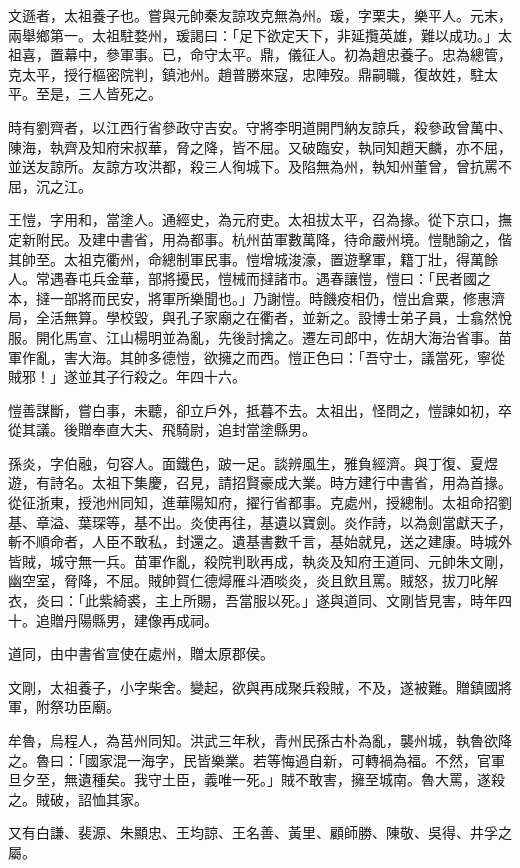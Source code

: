 \begin{pinyinscope}
文遜者，太祖養子也。嘗與元帥秦友諒攻克無為州。瑗，字栗夫，樂平人。元末，兩舉鄉第一。太祖駐婺州，瑗謁曰：「足下欲定天下，非延攬英雄，難以成功。」太祖喜，置幕中，參軍事。已，命守太平。鼎，儀征人。初為趙忠養子。忠為總管，克太平，授行樞密院判，鎮池州。趙普勝來寇，忠陣歿。鼎嗣職，復故姓，駐太平。至是，三人皆死之。

時有劉齊者，以江西行省參政守吉安。守將李明道開門納友諒兵，殺參政曾萬中、陳海，執齊及知府宋叔華，脅之降，皆不屈。又破臨安，執同知趙天麟，亦不屈，並送友諒所。友諒方攻洪都，殺三人徇城下。及陷無為州，執知州董曾，曾抗罵不屈，沉之江。

王愷，字用和，當塗人。通經史，為元府吏。太祖拔太平，召為掾。從下京口，撫定新附民。及建中書省，用為都事。杭州苗軍數萬降，待命嚴州境。愷馳諭之，偕其帥至。太祖克衢州，命總制軍民事。愷增城浚濠，置遊擊軍，籍丁壯，得萬餘人。常遇春屯兵金華，部將擾民，愷械而撻諸市。遇春讓愷，愷曰：「民者國之本，撻一部將而民安，將軍所樂聞也。」乃謝愷。時饑疫相仍，愷出倉粟，修惠濟局，全活無算。學校毀，與孔子家廟之在衢者，並新之。設博士弟子員，士翕然悅服。開化馬宣、江山楊明並為亂，先後討擒之。遷左司郎中，佐胡大海治省事。苗軍作亂，害大海。其帥多德愷，欲擁之而西。愷正色曰：「吾守士，議當死，寧從賊邪！」遂並其子行殺之。年四十六。

愷善謀斷，嘗白事，未聽，卻立戶外，抵暮不去。太祖出，怪問之，愷諫如初，卒從其議。後贈奉直大夫、飛騎尉，追封當塗縣男。

孫炎，字伯融，句容人。面鐵色，跛一足。談辨風生，雅負經濟。與丁復、夏煜遊，有詩名。太祖下集慶，召見，請招賢豪成大業。時方建行中書省，用為首掾。從征浙東，授池州同知，進華陽知府，擢行省都事。克處州，授總制。太祖命招劉基、章溢、葉琛等，基不出。炎使再往，基遺以寶劍。炎作詩，以為劍當獻天子，斬不順命者，人臣不敢私，封還之。遺基書數千言，基始就見，送之建康。時城外皆賊，城守無一兵。苗軍作亂，殺院判耿再成，執炎及知府王道同、元帥朱文剛，幽空室，脅降，不屈。賊帥賀仁德燖雁斗酒啖炎，炎且飲且罵。賊怒，拔刀叱解衣，炎曰：「此紫綺裘，主上所賜，吾當服以死。」遂與道同、文剛皆見害，時年四十。追贈丹陽縣男，建像再成祠。

道同，由中書省宣使在處州，贈太原郡侯。

文剛，太祖養子，小字柴舍。變起，欲與再成聚兵殺賊，不及，遂被難。贈鎮國將軍，附祭功臣廟。

牟魯，烏程人，為莒州同知。洪武三年秋，青州民孫古朴為亂，襲州城，執魯欲降之。魯曰：「國家混一海字，民皆樂業。若等悔過自新，可轉禍為福。不然，官軍旦夕至，無遺種矣。我守土臣，義唯一死。」賊不敢害，擁至城南。魯大罵，遂殺之。賊破，詔恤其家。

又有白謙、裴源、朱顯忠、王均諒、王名善、黃里、顧師勝、陳敬、吳得、井孚之屬。


\end{pinyinscope}
